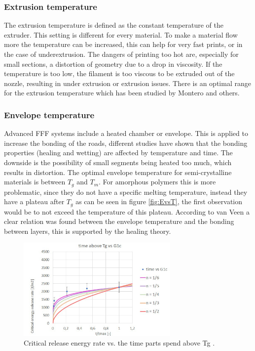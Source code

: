 \subsubsection {Extrusion temperature }
The extrusion temperature is defined as the constant temperature of the extruder. This setting is different for every material. To make a material flow more the temperature can be increased, this can help for very fast prints, or in the case of underextrusion. The dangers of printing too hot are, especially for small sections, a distortion of geometry due to a drop in viscosity. If the temperature is too low, the filament is too viscous to be extruded out of the nozzle, resulting in under extrusion or extrusion issues.  
There is an optimal range for the extrusion temperature which has been studied by Montero \cite{Montero2001MaterialExperiments} and others.

\subsubsection {Envelope temperature }
Advanced FFF systems include a heated chamber or envelope. This is applied to increase the bonding of the roads, different studies \cite{Sun2008} \cite{Bellehumeur2004ModelingProcess} have shown that the bonding properties (healing and wetting) are affected by temperature and time. The downside is the possibility of small segments being heated too much, which results in distortion. The optimal envelope temperature for semi-crystalline materials is between $T_g$ and $T_m$. For amorphous polymers this is more problematic, since they do not have a specific melting temperature, instead they have a plateau after $T_g$ as can be seen in figure \ref{fig:EvsT}, the first observation would be to not exceed the temperature of this plateau.
According to van Veen \cite{Veen2019EnhancingTemperature} a clear relation was found between the envelope temperature and the bonding between layers, this is supported by the healing theory. 

\begin{figure}[htb]
    \centering
    \includegraphics[width=0.7\textwidth]{chapter_2/figures/Dennisgraph.png}
    \caption{Critical release energy rate vs. the time parts spend above Tg \cite{Veen2019EnhancingTemperature}.}
    \label{fig:Dennisgraph}
\end{figure}

